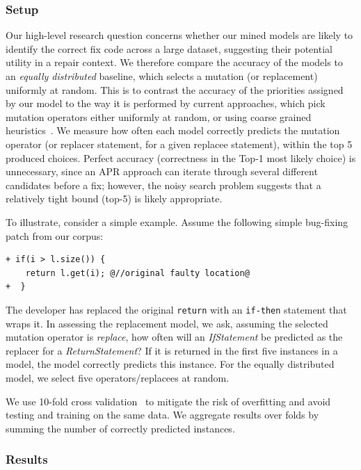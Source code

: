 \documentclass[conference]{IEEEtran}
\begin{document}
\subsubsection{Setup}
Our high-level research question concerns whether 
our mined models are likely to identify the correct fix code across a large
dataset, suggesting their potential utility in a repair context.  We therefore
compare the accuracy of the models to an \emph{equally distributed} baseline,
which selects a mutation (or replacement) uniformly at random. This is to contrast 
the accuracy of the priorities assigned by our model to the way it is
performed by current approaches, which pick mutation operators either
uniformly at random, or using coarse grained
heuristics~\cite{legoues12Genprog,kim2013,Qi13TrpAutoR,Weimer13}. 
We measure how often each model correctly predicts the mutation operator (or
replacer statement, for a given replacee statement), within the top 5 produced
choices. Perfect accuracy (correctness in the Top-1 most likely choice) is
unnecessary, since an
APR approach can iterate through several
different candidates before a fix; 
however, the noisy search problem suggests that a relatively tight bound (top-5)
is likely appropriate.

To illustrate, consider a simple example. Assume the following
simple bug-fixing patch from our corpus: 

\begin{lstlisting}[frame=single]
+ if(i > l.size()) {
    return l.get(i); @//original faulty location@
+  }    
\end{lstlisting}

The developer has replaced the original \texttt{return} with an
\texttt{if-then} statement that wraps it.  In assessing the replacement model,
we ask, assuming the selected mutation operator 
is \emph{replace}, how often will an \emph{IfStatement} be predicted as the
replacer for a \emph{ReturnStatement}? If it is returned in the first five
instances in a model, the model correctly predicts this instance.  For the
equally distributed model, we select five operators/replacees at random. 

We use 10-fold cross validation~\cite{kohavi95} to mitigate the risk
of overfitting and avoid testing and training on the same data.  We aggregate results over
folds by summing the number of correctly predicted instances.

\subsubsection{Results} 
\end{document}
